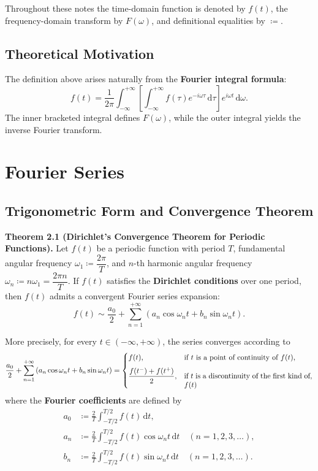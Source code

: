 \documentclass[11pt,a4paper]{article}
\theoremstyle{definition}
\theoremstyle{plain}
\begin{document}
Throughout these notes the time-domain function is denoted by $f(t)$, the frequency-domain transform by $F(\omega)$, and definitional equalities by $\coloneqq$.

\subsection{Theoretical Motivation}

The definition above arises naturally from the \textbf{Fourier integral formula}:
\begin{equation}
f(t) = \frac{1}{2\pi} \int_{-\infty}^{+\infty} \left[ \int_{-\infty}^{+\infty} f(\tau) e^{-i\omega \tau} \, \mathrm{d}\tau \right] e^{i\omega t} \, \mathrm{d}\omega.
\end{equation}
The inner bracketed integral defines $F(\omega)$, while the outer integral yields the inverse Fourier transform.

\section{Fourier Series}

\subsection{Trigonometric Form and Convergence Theorem}

\textbf{Theorem 2.1 (Dirichlet's Convergence Theorem for Periodic Functions).} Let $f(t)$ be a periodic function with period $T$, fundamental angular frequency $\omega_1 \coloneqq \dfrac{2\pi}{T}$, and $n$-th harmonic angular frequency $\omega_n \coloneqq n\omega_1 = \dfrac{2\pi n}{T}$. If $f(t)$ satisfies the \textbf{Dirichlet conditions} over one period, then $f(t)$ admits a convergent Fourier series expansion:
\begin{equation}
f(t) \sim \frac{a_0}{2} + \sum_{n=1}^{+\infty} \left( a_n \cos \omega_n t + b_n \sin \omega_n t \right).
\end{equation}

More precisely, for every $t \in (-\infty, +\infty)$, the series converges according to
\begin{equation}
\frac{a_0}{2} + \sum_{n=1}^{+\infty} \left( a_n \cos \omega_n t + b_n \sin \omega_n t \right)
=
\begin{cases}
f(t), & \parbox[t]{6.0cm}{if $t$ is a point of continuity of $f(t)$,}\\[6pt]
\dfrac{f(t^-) + f(t^+)}{2}, & \parbox[t]{6.0cm}{if $t$ is a discontinuity of the first kind of $f(t)$},
\end{cases}
\end{equation}
where the \textbf{Fourier coefficients} are defined by
\begin{align}
a_0 &\coloneqq \frac{2}{T} \int_{-T/2}^{T/2} f(t) \, \mathrm{d}t, \\
a_n &\coloneqq \frac{2}{T} \int_{-T/2}^{T/2} f(t) \cos \omega_n t \, \mathrm{d}t \quad (n = 1, 2, 3, \dots), \\
b_n &\coloneqq \frac{2}{T} \int_{-T/2}^{T/2} f(t) \sin \omega_n t \, \mathrm{d}t \quad (n = 1, 2, 3, \dots).
\end{align}
\end{document}

